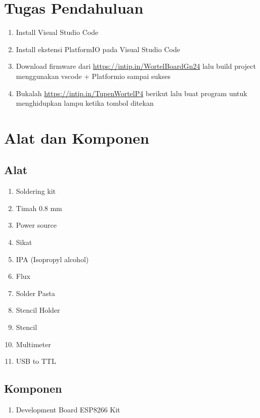 \section{Tugas Pendahuluan}
\begin{enumerate}
    \item Install Visual Studio Code 
    \item Install ekstensi PlatformIO pada Visual Studio Code 
    \item Download firmware dari \url{https://intip.in/WortelBoardGn24} lalu build project menggunakan vscode + Platformio sampai sukses
    \item Bukalah \url{https://intip.in/TupenWortelP4} berikut lalu buat program untuk menghidupkan lampu ketika tombol ditekan

\end{enumerate}

\section{Alat dan Komponen}
\subsection{Alat}
\begin{enumerate}
    \item Soldering kit
    \item Timah 0.8 mm
    \item Power source
    \item Sikat 
    \item IPA (Isopropyl alcohol)
    \item Flux
    \item Solder Pasta
    \item Stencil Holder
    \item Stencil
    \item Multimeter
    \item USB to TTL
\end{enumerate}

\subsection{Komponen}
\begin{enumerate}
    \item Development Board ESP8266 Kit
\end{enumerate}


